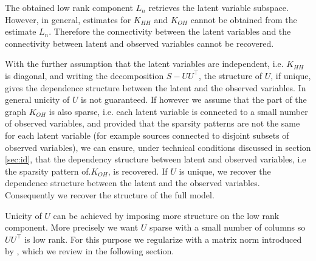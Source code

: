 
The obtained low rank component $L_{n}$ retrieves the latent variable subspace. However, in general, estimates for $K_{HH}$ and  $K_{OH}$ cannot be obtained from the estimate $L_{n}$. Therefore the connectivity between the latent variables and the connectivity between latent and observed variables cannot be recovered. 



With the further assumption that the latent variables are independent,  i.e. $K_{HH}$ is  diagonal,  and writing the decomposition $S-UU^{\top}$, the structure of $U$, if unique,   gives the dependence structure  between the latent and the observed variables. In general unicity of $U$ is not guaranteed. If however we assume that the part of the graph $K_{OH}$ is also sparse, i.e. each latent variable is connected to a small number of observed variables, and provided that the sparsity patterns are not the same for each latent variable (for example sources connected to disjoint subsets of observed variables), we can ensure, under technical conditions discussed in section \ref{sec:id}, that the dependency structure between latent and observed variables, i.e the sparsity pattern of.$K_{OH}$, is recovered. If $U$ is unique, we recover the dependence structure  between the latent and the observed variables. Consequently we recover the structure of the full model.




Unicity of $U$ can be achieved by imposing more structure on the low rank component. More precisely we want $U$ sparse with a small number of columns so $UU^{\top}$ is low rank. For this purpose we regularize with a matrix norm  introduced by \citet{richard2014tight}, which we review in the following
section.

